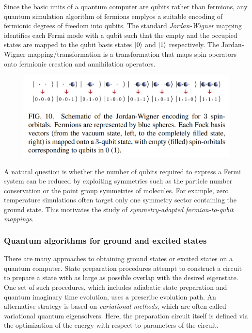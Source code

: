 \documentclass{book}
\theoremstyle{definition}
\begin{document}
\begin{enumerate}
	Since the basic units of a quantum computer are qubits rather than fermions, any quantum simulation algorithm of fermions emplyos a suitable encoding of fermionic degrees of freedom into qubits. The standard \textit{Jordan-Wigner} mapping identifies each Fermi mode with a qubit such that the empty and the occupied states are mapped to the qubit basis states $\ket{0}$ and $\ket{1}$ respectively. The Jordan-Wigner mapping/transformation is a transformation that maps spin operators onto fermionic creation and annihilation operators. 
	\begin{figure}[!htb]
		\centering
		\includegraphics[scale=0.3]{jw}
	\end{figure}
	A natural question is whether the number of qubits required to express a Fermi system can be reduced by exploiting symmetries such as the particle number conservation or
	the point group symmetries of molecules. For example, zero
	temperature simulations often target only one symmetry sector containing the ground state. This motivates the study
	of \textit{symmetry-adapted fermion-to-qubit mappings}.
\end{enumerate} 



\subsubsection{Quantum algorithms for ground and excited states}

There are many approaches to obtaining ground states or
excited states on a quantum computer. State preparation
procedures attempt to construct a circuit to prepare a state
with as large as possible overlap with the desired eigenstate. One set of such procedures, which includes adiabatic state preparation and quantum imaginary time evolution, uses a prescribe evolution path. An alternative strategy is based on \textit{variational methods}, which are often called variational quantum eigensolvers. Here, the preparation circuit itself is defined via the optimization of the energy with respect to parameters of the circuit. \\
\end{document}
